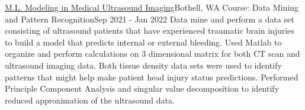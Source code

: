 \resumeSubheading
{\href{https://drive.google.com/file/d/1hJzap162z4QhbNTTLVZgvl25AcmKWR-z/view}{M.L. Modeling in Medical Ultrasound Imaging}}{Bothell, WA}
{Course: Data Mining and Pattern Recognition}{Sep 2021 - Jan 2022}
    \resumeItemListStart
          {Data mine and perform a data set consisting of ultrasound patients that have experienced traumatic brain injuries to build a model that predicts internal or external bleeding.}
          {Used Matlab to organize and perform calculations on 3 dimensional matrix for both CT scan and ultrasound imaging data. Both tissue density data sets were used to identify patterns that might help make patient head injury status predictions.}
          {Performed Principle Component Analysis and singular value decomposition to identify reduced approximation of the ultrasound data.}
    \resumeItemListEnd
